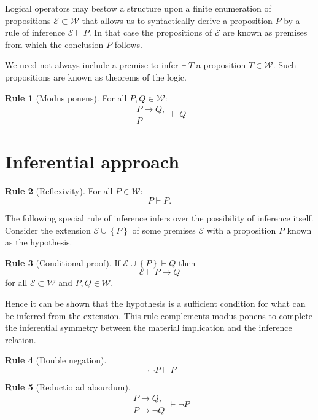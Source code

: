 \documentclass{amsbook}
\newcommand{\setsm}[1]{\left\{#1\right\}}
\newcommand{\infers}{\mathrel\vdash}
\newcommand{\theorem}{\mathord\vdash\medspace}
\newcommand{\then}{\mathrel\rightarrow}
\newcommand{\wffs}{\mathcal W}
\theoremstyle{definition}
\newtheorem{frule}{Rule}[section]
\begin{document}
Logical operators may bestow a structure upon a finite enumeration of propositions $\mathcal E \subset \mathcal W$ that allows us to syntactically derive a proposition $P$ by a rule of inference $\mathcal E \infers P$. In that case the propositions of $\mathcal E$ are known as premises from which the conclusion $P$ follows.

We need not always include a premise to infer $\theorem T$ a proposition $T \in \mathcal W$. Such propositions are known as theorems of the logic.

\begin{frule}[Modus ponens]
    For all $P, Q \in \wffs$:
    $$\begin{aligned}P \rightarrow Q, \\ P\end{aligned} \infers Q$$
\end{frule}

\section{Inferential approach}

\begin{frule}[Reflexivity] For all $P \in \wffs$:
    $$P \infers P.$$
\end{frule}

The following special rule of inference infers over the possibility of inference itself. Consider the extension $\mathcal E \cup\setsm P$ of some premises $\mathcal E$ with a proposition $P$ known as the hypothesis.

\begin{frule}[Conditional proof]
    If $\mathcal E \cup\setsm P \infers Q$ then
    $$\mathcal E \infers {P \then Q}$$
    for all $\mathcal E \subset \wffs$ and $P, Q \in \wffs$.
\end{frule}

Hence it can be shown that the hypothesis is a sufficient condition for what can be inferred from the extension. This rule complements modus ponens to complete the inferential symmetry between the material implication and the inference relation.

\begin{frule}[Double negation]
    $${\neg\neg P} \infers P$$
\end{frule}

\begin{frule}[Reductio ad absurdum]
    $$\begin{aligned}
            P \then Q, \\ P \then \neg Q
        \end{aligned} \infers \neg P$$
\end{frule}
\end{document}
